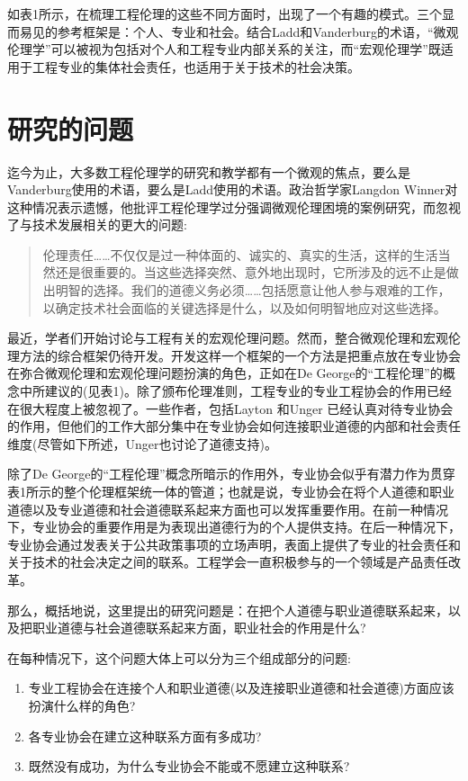 \documentclass[lang=cn,11pt,a4paper]{elegantpaper}
\begin{document}
如表1所示，在梳理工程伦理的这些不同方面时，出现了一个有趣的模式。三个显而易见的参考框架是：个人、专业和社会。结合Ladd和Vanderburg的术语，“微观伦理学”可以被视为包括对个人和工程专业内部关系的关注，而“宏观伦理学”既适用于工程专业的集体社会责任，也适用于关于技术的社会决策。
\section{研究的问题}
迄今为止，大多数工程伦理学的研究和教学都有一个微观的焦点，要么是Vanderburg使用的术语，要么是Ladd使用的术语。政治哲学家Langdon Winner\cite[p. 62]{8}对这种情况表示遗憾，他批评工程伦理学过分强调微观伦理困境的案例研究，而忽视了与技术发展相关的更大的问题:
\begin{quotation}
  伦理责任……不仅仅是过一种体面的、诚实的、真实的生活，这样的生活当然还是很重要的。当这些选择突然、意外地出现时，它所涉及的远不止是做出明智的选择。我们的道德义务必须……包括愿意让他人参与艰难的工作，以确定技术社会面临的关键选择是什么，以及如何明智地应对这些选择。
\end{quotation}

最近，学者们开始讨论与工程有关的宏观伦理问题\cite{9,10,11}。然而，整合微观伦理和宏观伦理方法的综合框架仍待开发。开发这样一个框架的一个方法是把重点放在专业协会在弥合微观伦理和宏观伦理问题扮演的角色，正如在De George的“工程伦理”的概念中所建议的(见表1)。除了颁布伦理准则，工程专业的专业工程协会的作用已经在很大程度上被忽视了。一些作者，包括Layton \cite{12}和Unger\cite{13} 已经认真对待专业协会的作用，但他们的工作大部分集中在专业协会如何连接职业道德的内部和社会责任维度(尽管如下所述，Unger也讨论了道德支持)。

除了De George的“工程伦理”概念所暗示的作用外，专业协会似乎有潜力作为贯穿表1所示的整个伦理框架统一体的管道；也就是说，专业协会在将个人道德和职业道德以及专业道德和社会道德联系起来方面也可以发挥重要作用。在前一种情况下，专业协会的重要作用是为表现出道德行为的个人提供支持。在后一种情况下，专业协会通过发表关于公共政策事项的立场声明，表面上提供了专业的社会责任和关于技术的社会决定之间的联系。工程学会一直积极参与的一个领域是产品责任改革。

那么，概括地说，这里提出的研究问题是：在把个人道德与职业道德联系起来，以及把职业道德与社会道德联系起来方面，职业社会的作用是什么?

在每种情况下，这个问题大体上可以分为三个组成部分的问题:

\begin{enumerate}
  \item 专业工程协会在连接个人和职业道德(以及连接职业道德和社会道德)方面应该扮演什么样的角色?
  \item 各专业协会在建立这种联系方面有多成功?
  \item 既然没有成功，为什么专业协会不能或不愿建立这种联系?
\end{enumerate}
\end{document}
